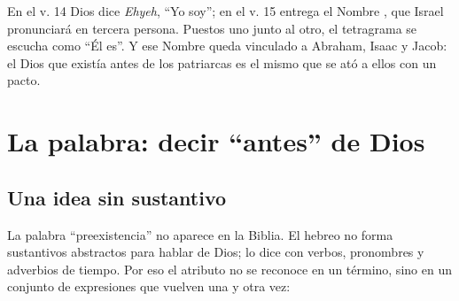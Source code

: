 En el v. 14 Dios dice \emph{Ehyeh}, ``Yo soy''; en el v. 15 entrega el Nombre , que Israel pronunciará en tercera persona. Puestos uno junto al otro, el tetragrama se escucha como ``Él es''. Y ese Nombre queda vinculado a Abraham, Isaac y Jacob: el Dios que existía antes de los patriarcas es el mismo que se ató a ellos con un pacto.


\section{La palabra: decir “antes” de Dios}

\subsection{Una idea sin sustantivo}
La palabra ``preexistencia'' no aparece en la Biblia. El hebreo no forma sustantivos abstractos para hablar de Dios; lo dice con verbos, pronombres y adverbios de tiempo. Por eso el atributo no se reconoce en un término, sino en un conjunto de expresiones que vuelven una y otra vez:

